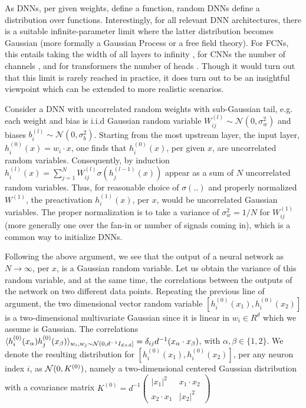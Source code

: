 As DNNs, per given weights, define a function, random DNNs define a distribution over functions. Interestingly, for all relevant DNN architectures, there is a suitable infinite-parameter limit where the latter distribution becomes Gaussian (more formally a Gaussian Process or a free field theory). For FCNs, this entails taking the width of all layers to infinity \citep{neal1996priors}, for CNNs the number of channels \citep{novak2018bayesian}, and for transformers the number of heads \citep{hron2020infinite}. Though it would turn out that this limit is rarely reached in practice, it does turn out to be an insightful viewpoint which can be extended to more realistic scenarios.

Consider a DNN with uncorrelated random weights with sub-Gaussian tail, e.g. each weight and bias is i.i.d Gaussian random variable $W_{ij}^{(l)}\sim \mathcal{N}(0, \sigma^2_w)$ and biases $b_i^{(l)}\sim \mathcal{N}(0, \sigma^2_b)$. Starting from the most upstream layer, the input layer, $h^{(0)}_i(x) = w_i \cdot x$, one finds that $h^{(0)}_i(x)$, per given $x$, are uncorrelated random variables. Consequently, by induction $h_i^{(l)}(x)=\sum_{j=1}^N W^{(l)}_{ij} \sigma(h^{(l-1)}_{j}(x))$ appear as a sum of $N$ uncorrelated random variables. Thus, for reasonable choice of $\sigma(..)$ and properly normalized $W^{(1)}$, the preactivation $h_i^{(1)}(x)$, per $x$, would be uncorrelated Gaussian variables. The proper normalization is to take a variance of $\sigma_w^2 = 1/N$ for $W^{(1)}_{ij}$ (more generally one over the fan-in or number of signals coming in), which is a common way to initialize DNNs. 

Following the above argument, we see that the output of a neural network as $N\rightarrow \infty$, per $x$, is a Gaussian random variable. Let us obtain the variance of this random variable, and at the same time, the correlations between the outputs of the network on two different data points. Repeating the previous line of argument, the two dimensional vector random variable $[h^{(0)}_i(x_1),h^{(0)}_i(x_2)]$ is a two-dimensional multivariate Gaussian since it is linear in $w_i \in R^d$ which we assume is Gaussian. The correlations $\langle h^{(0)}_i(x_{\alpha}) h^{(0)}_{j}(x_{\beta})\rangle_{w_i,w_j \sim {\cal N}(0,d^{-1}I_{d\times d}]}=\delta_{ij} d^{-1} (x_{\alpha} \cdot x_{\beta})$, with $\alpha,\beta \in \{1,2\}$. We denote the resulting distribution for $[h^{(0)}_i(x_{1}),h^{(0)}_i(x_{2})]$, per any neuron index $i$, as ${\cal N}(0,K^{(0)})$, namely a two-dimensional centered Gaussian distribution with a covariance matrix $K^{(0)}=d^{-1} \begin{pmatrix}
|x_1|^2 & x_1 \cdot x_2 \\
x_2 \cdot x_1 & |x_2|^2
\end{pmatrix}$


